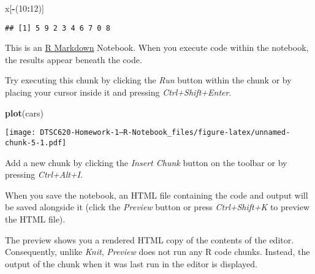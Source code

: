 \documentclass[
]{article}
\newenvironment{Shaded}{\begin{snugshade}}{\end{snugshade}}
\newcommand{\CommentTok}[1]{\textcolor[rgb]{0.56,0.35,0.01}{\textit{#1}}}
\newcommand{\DecValTok}[1]{\textcolor[rgb]{0.00,0.00,0.81}{#1}}
\newcommand{\KeywordTok}[1]{\textcolor[rgb]{0.13,0.29,0.53}{\textbf{#1}}}
\newcommand{\NormalTok}[1]{#1}
\newcommand{\OperatorTok}[1]{\textcolor[rgb]{0.81,0.36,0.00}{\textbf{#1}}}
\begin{document}
\begin{Shaded}
\begin{Highlighting}[]
\NormalTok{x[}\OperatorTok{-}\NormalTok{(}\DecValTok{10}\OperatorTok{:}\DecValTok{12}\NormalTok{)]}
\end{Highlighting}
\end{Shaded}

\begin{verbatim}
## [1] 5 9 2 3 4 6 7 0 8
\end{verbatim}

\begin{Shaded}
\end{Shaded}

This is an \href{http://rmarkdown.rstudio.com}{R Markdown} Notebook.
When you execute code within the notebook, the results appear beneath
the code.

Try executing this chunk by clicking the \emph{Run} button within the
chunk or by placing your cursor inside it and pressing
\emph{Ctrl+Shift+Enter}.

\begin{Shaded}
\begin{Highlighting}[]
\KeywordTok{plot}\NormalTok{(cars)}
\end{Highlighting}
\end{Shaded}

\texttt{[image: DTSC620-Homework-1---R-Notebook\_files/figure-latex/unnamed-chunk-5-1.pdf]}

Add a new chunk by clicking the \emph{Insert Chunk} button on the
toolbar or by pressing \emph{Ctrl+Alt+I}.

When you save the notebook, an HTML file containing the code and output
will be saved alongside it (click the \emph{Preview} button or press
\emph{Ctrl+Shift+K} to preview the HTML file).

The preview shows you a rendered HTML copy of the contents of the
editor. Consequently, unlike \emph{Knit}, \emph{Preview} does not run
any R code chunks. Instead, the output of the chunk when it was last run
in the editor is displayed.
\end{document}
